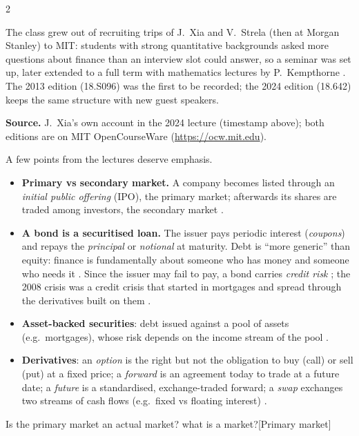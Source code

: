 \begin{paracol}{2}
\begin{history}
The class grew out of recruiting trips of J.~Xia and V.~Strela (then at Morgan Stanley) to MIT:
students with strong quantitative backgrounds asked more questions about finance than an
interview slot could answer, so a seminar was set up, later extended to a full term with
mathematics lectures by P.~Kempthorne . The 2013 edition (18.S096) was the
first to be recorded; the 2024 edition (18.642) keeps the same structure with new guest speakers.

\smallskip
{\footnotesize\textbf{Source.} J.~Xia's own account in the 2024 lecture (timestamp above); both
editions are on MIT OpenCourseWare (\url{https://ocw.mit.edu}).}
\end{history}

A few points from the lectures deserve emphasis.
\begin{itemize}
  \item \textbf{Primary vs secondary market.} A company becomes listed through an
        \emph{initial public offering} (IPO), the primary market; afterwards its shares are
        traded among investors, the secondary market .
  \item \textbf{A bond is a securitised loan.} The issuer pays periodic interest
        (\emph{coupons}) and repays the \emph{principal} or \emph{notional} at maturity.
        Debt is ``more generic'' than equity: finance is fundamentally about someone who has
        money and someone who needs it . Since the issuer may fail to pay,
        a bond carries \emph{credit risk} ; the 2008 crisis was a credit crisis
        that started in mortgages and spread through the derivatives built on them
        .
  \item \textbf{Asset-backed securities}: debt issued against a pool of assets (e.g.\ mortgages),
        whose risk depends on the income stream of the pool .
  \item \textbf{Derivatives}: an \emph{option} is the right but not the obligation to buy
        (call) or sell (put) at a fixed price; a \emph{forward} is an agreement today to trade
        at a future date; a \emph{future} is a standardised, exchange-traded forward; a
        \emph{swap} exchanges two streams of cash flows (e.g.\ fixed vs floating interest)
        .
\end{itemize}
\begin{answer}{Is the primary market an actual market? what is a market?}[Primary market]

\end{answer}
\end{paracol}
